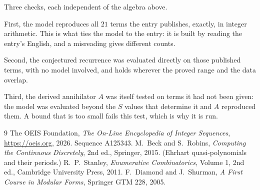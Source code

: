 \documentclass[11pt,a4paper]{article}
\theoremstyle{plain}
\theoremstyle{definition}
\begin{document}
Three checks, each independent of the algebra above.

First, the model reproduces all $21$ terms the entry publishes, exactly, in integer
arithmetic. This is what ties the model to the entry: it is built by reading the entry's
English, and a misreading gives different counts.

Second, the conjectured recurrence was evaluated directly on those published terms, with no
model involved, and holds wherever the proved range and the data overlap.

Third, the derived annihilator $A$ was itself tested on terms it had not been given: the model
was evaluated beyond the $S$ values that determine it and $A$ reproduced them. A bound that is
too small fails this test, which is why it is run.

\begin{thebibliography}{9}
 The OEIS Foundation, \emph{The On-Line Encyclopedia of Integer
Sequences}, \url{https://oeis.org}, 2026. Sequence A125343.
 M.~Beck and S.~Robins, \emph{Computing the Continuous Discretely},
2nd ed., Springer, 2015. (Ehrhart quasi-polynomials and their periods.)
 R.~P.~Stanley, \emph{Enumerative Combinatorics}, Volume 1, 2nd ed.,
Cambridge University Press, 2011.
 F.~Diamond and J.~Shurman, \emph{A First Course in Modular Forms},
Springer GTM 228, 2005.
\end{thebibliography}
\end{document}
